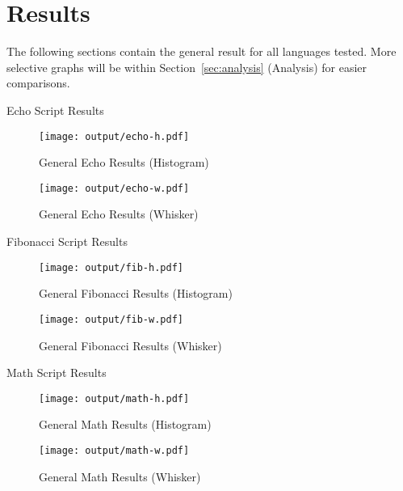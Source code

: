 \section{Results} \label{sec:results}
The following sections contain the general result for all languages tested. More selective graphs will be within Section~\ref{sec:analysis} (Analysis) for easier comparisons.

\begin{table}[H]
	\centering
	\caption{Echo Script Results}
	\label{tab:echo}
\end{table}

\begin{figure}[H]
	\centering
		\texttt{[image: output/echo-h.pdf]}
	\caption{General Echo Results (Histogram)}
	\label{fig:echo-h}
\end{figure}

\begin{figure}[H]
	\centering
		\texttt{[image: output/echo-w.pdf]}
	\caption{General Echo Results (Whisker)}
	\label{fig:echo-w}
\end{figure}

\begin{table}[H]
	\centering
	\caption{Fibonacci Script Results}
	\label{tab:fib}
\end{table}

\begin{figure}[H]
	\centering
		\texttt{[image: output/fib-h.pdf]}
	\caption{General Fibonacci Results (Histogram)}
	\label{fig:fib-h}
\end{figure}

\begin{figure}[H]
	\centering
		\texttt{[image: output/fib-w.pdf]}
	\caption{General Fibonacci Results (Whisker)}
	\label{fig:fib-w}
\end{figure}

\begin{table}[H]
	\centering
	\caption{Math Script Results}
	\label{tab:math}
\end{table}

\begin{figure}[H]
	\centering
		\texttt{[image: output/math-h.pdf]}
	\caption{General Math Results (Histogram)}
	\label{fig:math-h}
\end{figure}

\begin{figure}[H]
	\centering
		\texttt{[image: output/math-w.pdf]}
	\caption{General Math Results (Whisker)}
	\label{fig:math-w}
\end{figure}
